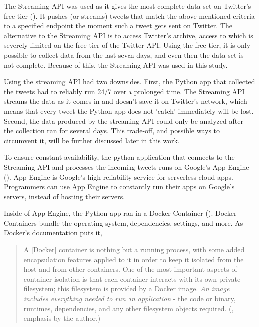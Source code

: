 The Streaming API was used as it gives the most complete data set on Twitter's free tier (\cite{brunsTwitterDataWhat2014}). It pushes (or streams) tweets that match the above-mentioned criteria to a specified endpoint the moment such a tweet gets sent on Twitter. The alternative to the Streaming API is to access Twitter's archive, access to which is severely limited on the free tier of the Twitter API. Using the free tier, it is only possible to collect data from the last seven days, and even then the data set is not complete. Because of this, the Streaming API was used in this study.

Using the streaming API had two downsides. First, the Python app that collected the tweets had to reliably run 24/7 over a prolonged time. The Streaming API streams the data as it comes in and doesn't save it on Twitter's network, which means that every tweet the Python app does not 'catch' immediately will be lost. Second, the data produced by the streaming API could only be analyzed after the collection ran for several days. This trade-off, and possible ways to circumvent it, will be further discussed later in this work.

To ensure constant availability, the python application that connects to the Streaming API and processes the incoming tweets runs on Google's App Engine (\cite{googleAppEngineApplication2020}). App Engine is Google's high-reliability service for serverless cloud apps. Programmers can use App Engine to constantly run their apps on Google's servers, instead of hosting their servers.

Inside of App Engine, the Python app ran in a Docker Container (\cite{merkel2014docker}). Docker Containers bundle the operating system, dependencies, settings, and more. As Docker's documentation puts it,

\begin{quote}
    A [Docker] container is nothing but a running process, with some added encapsulation features applied to it in order to keep it isolated from the host and from other containers. One of the most important aspects of container isolation is that each container interacts with its own private filesystem; this filesystem is provided by a Docker image. \emph{An image includes everything needed to run an application} - the code or binary, runtimes, dependencies, and any other filesystem objects required. (\cite{dockerOrientationSetup2020}, emphasis by the author.)
\end{quote}

